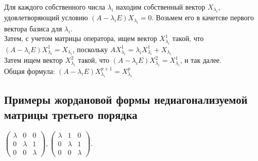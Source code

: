 \documentclass[12pt]{article}
\begin{document}
Для каждого собственного числа \(\lambda_i\) находим собственный вектор \(X_{\lambda_i}\), удовлетворяющий условию \((A - \lambda_iE)X_{\lambda_i} = 0\). Возьмем его в качетсве первого вектора базиса для \(\lambda_i\). \\
Затем, с учетом матрицы оператора, ищем вектор \(X_{\lambda_i}^1\) такой, что \((A - \lambda_iE)X_{\lambda_i}^1 = X_{\lambda_i}\), поскольку \(AX_{\lambda_i}^1 = \lambda_iX_{\lambda_i}^1 + X_{\lambda_i}\)\\
Затем ищем вектор \(X_{\lambda_i}^2\) такой, что \((A - \lambda_iE)X_{\lambda_i}^2 = X_{\lambda_i}^1\), и так далее.\\
Общая формула: \((A - \lambda_iE)X_{\lambda_i}^{p+1} = X_{\lambda_i}^p\)\\

\subsection{Примеры жордановой формы недиагонализуемой матрицы третьего порядка}
$
    \begin{pmatrix}
        \lambda & 0       & 0       \\
        0       & \lambda & 1       \\
        0       & 0       & \lambda
    \end{pmatrix},
    \begin{pmatrix}
        \lambda & 1       & 0       \\
        0       & \lambda & 1       \\
        0       & 0       & \lambda
    \end{pmatrix}$.
\end{document}
